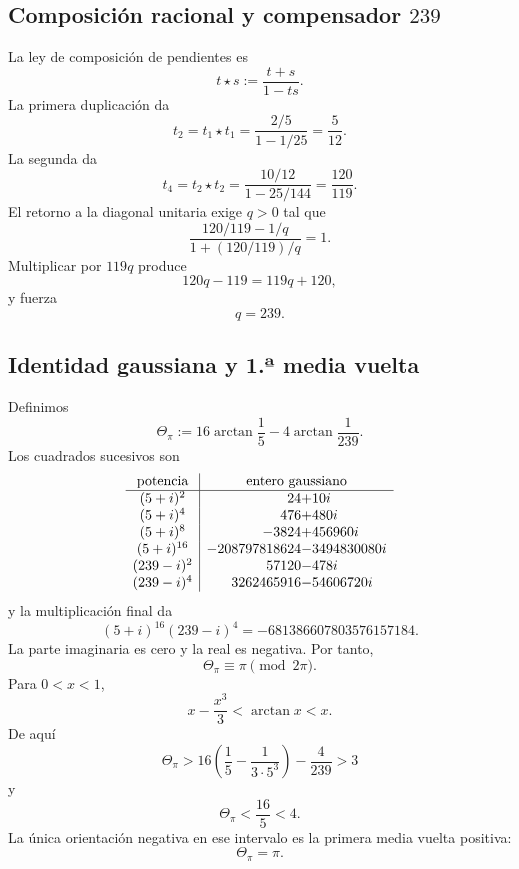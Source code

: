 \subsection{Composición racional y compensador \texorpdfstring{\(239\)}{239}}

La ley de composición de pendientes es
\[
 t\star s:=\frac{t+s}{1-ts}.
\]
La primera duplicación da
\[
 t_2=t_1\star t_1
 =\frac{2/5}{1-1/25}
 =\frac5{12}.
\]
La segunda da
\[
 t_4=t_2\star t_2
 =\frac{10/12}{1-25/144}
 =\frac{120}{119}.
\]
El retorno a la diagonal unitaria exige \(q>0\) tal que
\[
 \frac{120/119-1/q}{1+(120/119)/q}=1.
\]
Multiplicar por \(119q\) produce
\[
 120q-119=119q+120,
\]
y fuerza
\begin{equation}
 \boxed{q=239.}
 \label{p12-83-c8-s1:eq:compensador-239-pi}
\end{equation}

\subsection{Identidad gaussiana y 1.ª media vuelta}

Definimos
\begin{equation}
 \Theta_\pi
 :=16\arctan\frac15-4\arctan\frac1{239}.
 \label{p12-83-c8-s1:eq:theta-pi-autonoma}
\end{equation}
Los cuadrados sucesivos son
\[
\begin{array}{c|r@{}l}
\text{potencia}&\multicolumn{2}{c}{\text{entero gaussiano}}\\ \hline
(5+i)^2&24&+10i\\
(5+i)^4&476&+480i\\
(5+i)^8&-3824&+456960i\\
(5+i)^{16}&-208797818624&-3494830080i\\
(239-i)^2&57120&-478i\\
(239-i)^4&3262465916&-54606720i
\end{array}
\]
y la multiplicación final da
\begin{equation}
 \boxed{
 (5+i)^{16}(239-i)^4
 =-681386607803576157184.}
 \label{p12-83-c8-s1:eq:identidad-gaussiana-pi-autonoma}
\end{equation}
La parte imaginaria es cero y la real es negativa. Por tanto,
\[
 \Theta_\pi\equiv\pi\pmod{2\pi}.
\]
Para \(0<x<1\),
\[
 x-\frac{x^3}{3}<\arctan x<x.
\]
De aquí
\[
 \Theta_\pi>
 16\left(\frac15-\frac1{3\cdot5^3}\right)-\frac4{239}>3
\]
y
\[
 \Theta_\pi<\frac{16}{5}<4.
\]
La única orientación negativa en ese intervalo es la primera media vuelta
positiva:
\begin{equation}
 \boxed{\Theta_\pi=\pi.}
 \label{p12-83-c8-s1:eq:reconocimiento-pi-exacto}
\end{equation}

